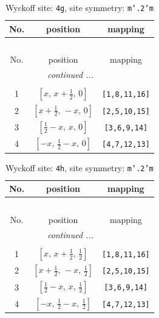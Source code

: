\documentclass[fleqn,8pt]{jsarticle}
\begin{document}
\renewcommand{\arraystretch}{1.2}
\begin{longtable}{ccc}
\caption{Wyckoff site: {\tt 4g}, site symmetry: {\tt m'.2'm}}
 \\
 \hline \hline
No. & position & mapping \\ \hline \endfirsthead

\multicolumn{2}{l}{\tablename\ \thetable{}} \\
 \hline \hline
No. & position & mapping \\ \hline \endhead

 \hline \hline
\multicolumn{2}{r}{\footnotesize\it continued ...} \\ \endfoot

 \hline \hline
\multicolumn{2}{r}{} \\ \endlastfoot

1 & $\left[ x,\, x + \frac{1}{2},\, 0 \right]$ & {\tt [1,8,11,16]} \\ \hline
2 & $\left[ x + \frac{1}{2},\, - x,\, 0 \right]$ & {\tt [2,5,10,15]} \\ \hline
3 & $\left[ \frac{1}{2} - x,\, x,\, 0 \right]$ & {\tt [3,6,9,14]} \\ \hline
4 & $\left[ - x,\, \frac{1}{2} - x,\, 0 \right]$ & {\tt [4,7,12,13]} \\
\end{longtable}
\renewcommand{\arraystretch}{1.2}
\begin{longtable}{ccc}
\caption{Wyckoff site: {\tt 4h}, site symmetry: {\tt m'.2'm}}
 \\
 \hline \hline
No. & position & mapping \\ \hline \endfirsthead

\multicolumn{2}{l}{\tablename\ \thetable{}} \\
 \hline \hline
No. & position & mapping \\ \hline \endhead

 \hline \hline
\multicolumn{2}{r}{\footnotesize\it continued ...} \\ \endfoot

 \hline \hline
\multicolumn{2}{r}{} \\ \endlastfoot

1 & $\left[ x,\, x + \frac{1}{2},\, \frac{1}{2} \right]$ & {\tt [1,8,11,16]} \\ \hline
2 & $\left[ x + \frac{1}{2},\, - x,\, \frac{1}{2} \right]$ & {\tt [2,5,10,15]} \\ \hline
3 & $\left[ \frac{1}{2} - x,\, x,\, \frac{1}{2} \right]$ & {\tt [3,6,9,14]} \\ \hline
4 & $\left[ - x,\, \frac{1}{2} - x,\, \frac{1}{2} \right]$ & {\tt [4,7,12,13]} \\
\end{longtable}
\end{document}
